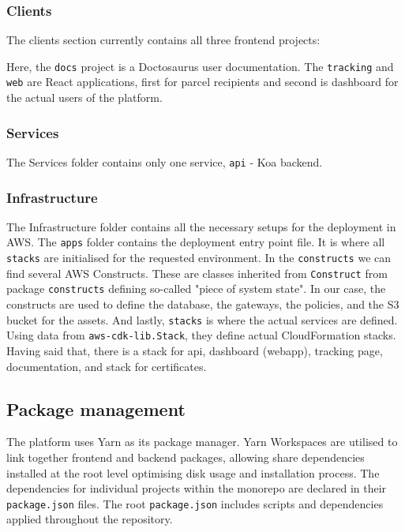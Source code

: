 \subsubsection{Clients}
The clients section currently contains all three frontend projects:

Here, the \texttt{docs} project is a Doctosaurus user documentation. The \texttt{tracking} and \texttt{web} are React applications, first for parcel recipients and second is dashboard for the actual users of the platform.

\subsubsection{Services}
The Services folder contains only one service, \texttt{api} - Koa backend.

\subsubsection{Infrastructure}
The Infrastructure folder contains all the necessary setups for the deployment in \ac{AWS}.
The \texttt{apps} folder contains the deployment entry point file. It is where all \texttt{stacks} are initialised for the requested environment.
In the \texttt{constructs} we can find several AWS Constructs.
These are classes inherited from \texttt{Construct} from package \texttt{constructs} defining so-called "piece of system state".
In our case, the constructs are used to define the database, the gateways, the policies, and the S3 bucket for the assets.
And lastly, \texttt{stacks} is where the actual services are defined.
Using data from \texttt{aws-cdk-lib.Stack}, they define actual CloudFormation stacks.
Having said that, there is a stack for api, dashboard (webapp), tracking page, documentation, and stack for certificates.



\subsection{Package management}
The platform uses Yarn as its package manager.
Yarn Workspaces are utilised to link together frontend and backend packages, allowing share dependencies installed at the root level optimising disk usage and installation process.
The dependencies for individual projects within the monorepo are declared in their \texttt{package.json} files.
The root \texttt{package.json} includes scripts and dependencies applied throughout the repository.

